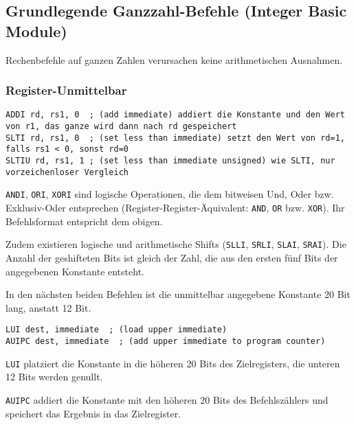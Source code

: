 \subsection{Grundlegende Ganzzahl-Befehle (Integer Basic Module)}

Rechenbefehle auf ganzen Zahlen verursachen keine arithmetischen Ausnahmen.

\subsubsection{Register-Unmittelbar}

\begin{lstlisting}[style=risc-v_Assembler]
ADDI rd, rs1, 0  ; (add immediate) addiert die Konstante und den Wert von r1, das ganze wird dann nach rd gespeichert
SLTI rd, rs1, 0  ; (set less than immediate) setzt den Wert von rd=1, falls rs1 < 0, sonst rd=0
SLTIU rd, rs1, 1 ; (set less than immediate unsigned) wie SLTI, nur vorzeichenloser Vergleich
\end{lstlisting}

\lstinline[style=risc-v_Assembler]!ANDI!, \lstinline[style=risc-v_Assembler]!ORI!, \lstinline[style=risc-v_Assembler]!XORI! sind logische Operationen, die dem bitweisen Und, Oder bzw. Exklusiv-Oder entsprechen (Register-Register-Äquivalent: \lstinline[style=risc-v_Assembler]!AND!, \lstinline[style=risc-v_Assembler]!OR! bzw. \lstinline[style=risc-v_Assembler]!XOR!). Ihr
Befehlsformat entspricht dem obigen.

Zudem existieren logische und arithmetische Shifts (\lstinline[style=risc-v_Assembler]!SLLI!, \lstinline[style=risc-v_Assembler]!SRLI!, \lstinline[style=risc-v_Assembler]!SLAI!, \lstinline[style=risc-v_Assembler]!SRAI!). Die Anzahl
der geshifteten Bits ist gleich der Zahl, die aus den ersten fünf Bits der angegebenen Konstante entsteht.

In den nächsten beiden Befehlen ist die unmittelbar angegebene Konstante 20 Bit lang, anstatt 12 Bit.

\begin{lstlisting}[style=risc-v_Assembler]
LUI dest, immediate  ; (load upper immediate)
AUIPC dest, immediate  ; (add upper immediate to program counter)
\end{lstlisting}

\lstinline[style=risc-v_Assembler]!LUI! platziert die Konstante in die höheren 20 Bits des Zielregisters, die unteren 12 Bits werden genullt.

\lstinline[style=risc-v_Assembler]!AUIPC! addiert die Konstante mit den höheren 20 Bits des Befehlszählers und speichert das Ergebnis in das Zielregister.

